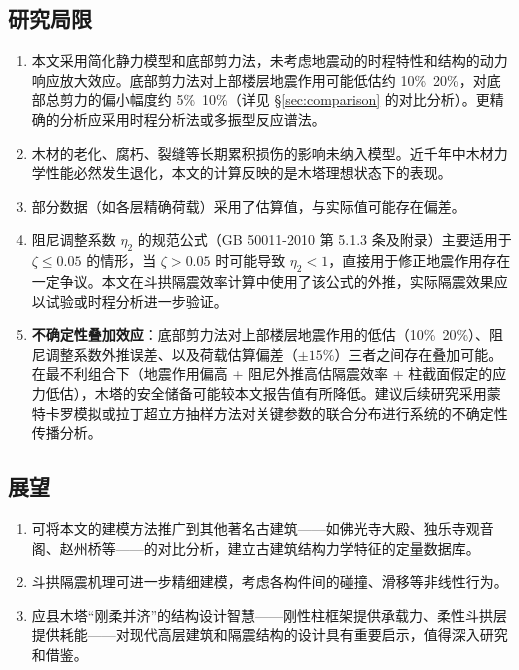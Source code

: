 \documentclass[12pt,a4paper,UTF8]{ctexart}
\begin{document}
\subsection{研究局限}
\label{sec:limitations}

\begin{enumerate}
    \item 本文采用简化静力模型和底部剪力法，未考虑地震动的时程特性和结构的动力响应放大效应。底部剪力法对上部楼层地震作用可能低估约 10\%~20\%，对底部总剪力的偏小幅度约 5\%~10\%（详见 §\ref{sec:comparison} 的对比分析）。更精确的分析应采用时程分析法或多振型反应谱法。
    \item 木材的老化、腐朽、裂缝等长期累积损伤的影响未纳入模型。近千年中木材力学性能必然发生退化，本文的计算反映的是木塔理想状态下的表现。
    \item 部分数据（如各层精确荷载）采用了估算值，与实际值可能存在偏差。
    \item 阻尼调整系数 $\eta_2$ 的规范公式（GB 50011-2010 第 5.1.3 条及附录）主要适用于 $\zeta \leq 0.05$ 的情形，当 $\zeta > 0.05$ 时可能导致 $\eta_2 < 1$，直接用于修正地震作用存在一定争议。本文在斗拱隔震效率计算中使用了该公式的外推，实际隔震效果应以试验或时程分析进一步验证。
    \item \textbf{不确定性叠加效应}：底部剪力法对上部楼层地震作用的低估（10\%~20\%）、阻尼调整系数外推误差、以及荷载估算偏差（$\pm 15\%$）三者之间存在叠加可能。在最不利组合下（地震作用偏高 + 阻尼外推高估隔震效率 + 柱截面假定的应力低估），木塔的安全储备可能较本文报告值有所降低。建议后续研究采用蒙特卡罗模拟或拉丁超立方抽样方法对关键参数的联合分布进行系统的不确定性传播分析。
\end{enumerate}

\subsection{展望}

\begin{enumerate}
    \item 可将本文的建模方法推广到其他著名古建筑——如佛光寺大殿、独乐寺观音阁、赵州桥等——的对比分析，建立古建筑结构力学特征的定量数据库。
    \item 斗拱隔震机理可进一步精细建模，考虑各构件间的碰撞、滑移等非线性行为。
    \item 应县木塔“刚柔并济”的结构设计智慧——刚性柱框架提供承载力、柔性斗拱层提供耗能——对现代高层建筑和隔震结构的设计具有重要启示，值得深入研究和借鉴。
\end{enumerate}
\end{document}
